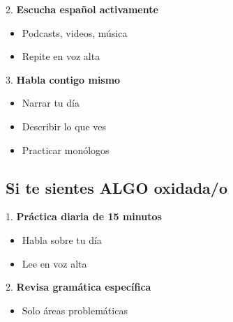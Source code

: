 \documentclass[a4paper,11pt]{article}
\begin{document}
\vspace{0.2cm}

2. \textbf{Escucha español activamente}

\begin{itemize}

  \item Podcasts, videos, música

  \item Repite en voz alta

\end{itemize}

\vspace{0.2cm}

3. \textbf{Habla contigo mismo}

\begin{itemize}

  \item Narrar tu día

  \item Describir lo que ves

  \item Practicar monólogos

\end{itemize}

\vspace{0.2cm}

\subsection{Si te sientes ALGO oxidada/o}

\vspace{0.2cm}

1. \textbf{Práctica diaria de 15 minutos}

\begin{itemize}

  \item Habla sobre tu día

  \item Lee en voz alta

\end{itemize}

\vspace{0.2cm}

2. \textbf{Revisa gramática específica}

\begin{itemize}

  \item Solo áreas problemáticas

\end{itemize}
\end{document}

